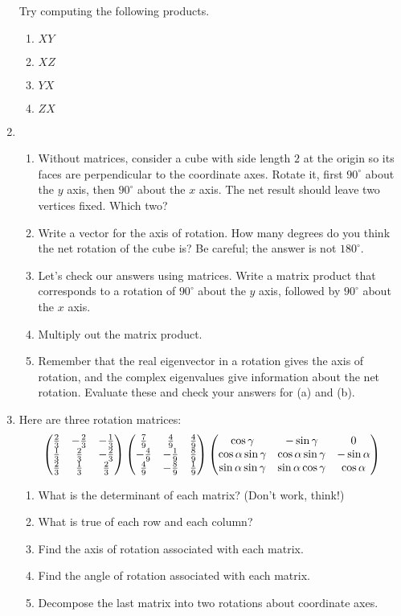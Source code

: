 \documentclass[../gatm_answers.tex]{subfiles}
\begin{document}
\begin{enumerate}
Try computing the following products.
\begin{multicols}{4}
\begin{enumerate}
\item $XY$
\item $XZ$
\item $YX$
\item $ZX$
\end{enumerate}
\end{multicols}
\item \begin{enumerate}
\item Without matrices, consider a cube with side length $2$ at the origin so its faces are perpendicular to the coordinate axes. Rotate it, first $90^\circ$ about the $y$ axis, then $90^\circ$ about the $x$ axis. The net result should leave two vertices fixed. Which two?
\item Write a vector for the axis of rotation. How many degrees do you think the net rotation of the cube is? Be careful; the answer is not $180^\circ$.
\item Let's check our answers using matrices. Write a matrix product that corresponds to a rotation of $90^\circ$ about the $y$ axis, followed by $90^\circ$ about the $x$ axis.
\item Multiply out the matrix product.
\item Remember that the real eigenvector in a rotation gives the axis of rotation, and the complex eigenvalues give information about the net rotation. Evaluate these and check your answers for (a) and (b).
\end{enumerate}
\item Here are three rotation matrices:
$$\begin{pmatrix} \frac{2}{3} & -\frac{2}{3} & -\frac{1}{3} \\ \frac{1}{3} & \frac{2}{3} & -\frac{2}{3} \\ \frac{2}{3} & \frac{1}{3} & \frac{2}{3} \end{pmatrix}
\begin{pmatrix} \frac{7}{9} & \frac{4}{9} & \frac{4}{9} \\ -\frac{4}{9} & -\frac{1}{9} & \frac{8}{9} \\ \frac{4}{9} & -\frac{8}{9} & \frac{1}{9} \end{pmatrix}
\begin{pmatrix} \cos\gamma & -\sin\gamma & 0 \\ \cos\alpha\sin\gamma & \cos\alpha\sin\gamma & -\sin\alpha \\ \sin\alpha\sin\gamma & \sin\alpha\cos\gamma & \cos\alpha \end{pmatrix}$$
\begin{enumerate}
\item What is the determinant of each matrix? (Don't work, think!)
\item What is true of each row and each column?
\item Find the axis of rotation associated with each matrix.
\item Find the angle of rotation associated with each matrix.
\item Decompose the last matrix into two rotations about coordinate axes.
\end{enumerate}
\end{enumerate}
\end{document}
